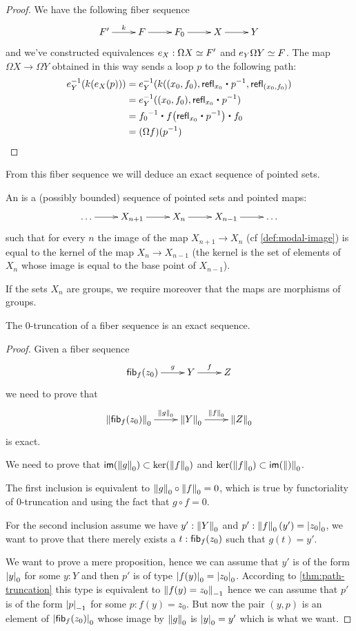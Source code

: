 \begin{proof}
  We have the following fiber sequence
  \[\xymatrix{F' \ar^-k[r] & F \ar[r] & F_0 \ar[r] & X \ar[r] & Y}\]
  and we’ve constructed equivalences $e_X:\eqv{\Omega X}{F'}$ and
  $e_Y\eqv{\Omega Y}{F}$. The map $\Omega X\to\Omega Y$ obtained in this way
  sends a loop $p$ to the following path:
  \begin{align*}
    e_Y^{-1}(k(e_X(p))) &=
    e_Y^{-1}(k((x_0,f_0),\refl{x_0}\ct\rev{p},\refl{(x_0,f_0)}) \\
    &= e_Y^{-1}((x_0,f_0),\refl{x_0}\ct\rev{p}) \\
    &= \rev{f_0}\ct\ap{f}{\refl{x_0}\ct\rev{p}}\ct f_0 \\
    &= (\Omega f)(\rev{p})
  \end{align*}
\end{proof}

From this fiber sequence we will deduce an exact sequence of pointed sets.

\begin{defn}
  An  is a (possibly bounded) sequence of pointed sets
  and pointed maps:
  \[\xymatrix{\dots \ar[r] & X_{n+1} \ar[r] & X_n \ar[r] & X_{n-1} \ar[r] &
    \dots}\]
  such that for every $n$ the image of the map $X_{n+1}\to{}X_n$ (cf
  \autoref{def:modal-image}) is equal to the kernel of the map $X_n\to{}X_{n-1}$
  (the kernel is the set of elements of $X_n$ whose image is equal to the base
  point of $X_{n-1}$).

  If the sets $X_n$ are groups, we require moreover that the maps are morphisms
  of groups.
\end{defn}

\begin{lem}
  The $0$-truncation of a fiber sequence is an exact sequence.
\end{lem}
\begin{proof}
  Given a fiber sequence
  \[\xymatrix{\hfib{f}{z_0} \ar^-g[r] & Y \ar^-f[r] & Z}\]
  we need to prove that
  \[\xymatrix{\trunc{0}{\hfib{f}{z_0}} \ar^-{\trunc0g}[r] & \trunc0{Y}
    \ar^-{\trunc0{f}}[r] & \trunc0{Z}}\]
  is exact.

  We need to prove that $\im(\trunc0g)\subset\ker(\trunc0f)$ and
  $\ker(\trunc0f)\subset\im(\trunc0)$.

  The first inclusion is equivalent to $\trunc0g\circ\trunc0f=0$, which is true
  by functoriality of 0-truncation and using the fact that $g\circ f=0$.

  For the second inclusion assume we have $y':\trunc0Y$ and
  $p':\trunc0f(y')=\tproj0{z_0}$, we want to prove that there merely exists a
  $t:\hfib{f}{z_0}$ such that $g(t)=y'$.

  We want to prove a mere proposition, hence we can assume that $y'$ is of the
  form $\tproj0y$ for some $y:Y$ and then $p'$ is of type
  $\tproj0{f(y)}=\tproj0{z_0}$. According to \autoref{thm:path-truncation} this
  type is equivalent to $\trunc{-1}{f(y)=z_0}$ hence we can assume that $p'$ is
  of the form $\tproj{-1}{p}$ for some $p:f(y)=z_0$. But now the pair $(y,p)$ is
  an element of $\tproj0{\hfib{f}{z_0}}$ whose image by $\trunc0g$ is
  $\tproj0y=y'$ which is what we want.
\end{proof}

